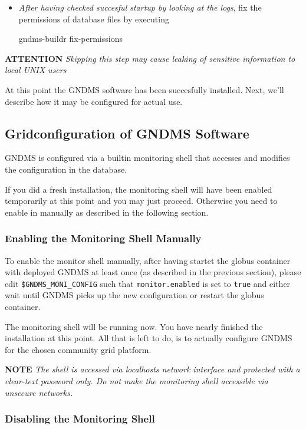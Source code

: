 \documentclass{article}
\begin{document}
\begin{itemize}
\item
  \emph{After having checked succesful startup by looking at the logs},
  fix the permissions of database files by executing

  gndms-buildr fix-permissions

\end{itemize}
\textbf{ATTENTION}
\emph{Skipping this step may cause leaking of sensitive information to local UNIX users}

At this point the GNDMS software has been succesfully installed.
Next, we'll describe how it may be configured for actual use.

\subsection{Gridconfiguration of GNDMS Software}

GNDMS is configured via a builtin monitoring shell that accesses
and modifies the configuration in the database.

If you did a fresh installation, the monitoring shell will have
been enabled temporarily at this point and you may just proceed.
Otherwise you need to enable in manually as described in the
following section.

\subsubsection{Enabling the Monitoring Shell Manually}

To enable the monitor shell manually, after having startet the
globus container with deployed GNDMS at least once (as described in
the previous section), please edit \verb!$GNDMS_MONI_CONFIG! such
that \verb!monitor.enabled! is set to \verb!true! and either wait
until GNDMS picks up the new configuration or restart the globus
container.

The monitoring shell will be running now. You have nearly finished
the installation at this point. All that is left to do, is to
actually configure GNDMS for the chosen community grid platform.

\textbf{NOTE}
\emph{The shell is accessed via localhosts network interface and protected with a clear-text password only. Do not make the monitoring shell accessible via unsecure networks.}

\subsubsection{Disabling the Monitoring Shell}
\end{document}
